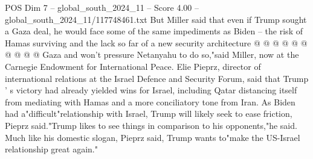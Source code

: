 \begin{textsample}{POS Dim 7 – global\_south\_2024\_11 – Score 4.00 – global\_south\_2024\_11/117748461.txt}
But Miller said that even if Trump sought a Gaza deal, he would face some of the same impediments as Biden -- the risk of Hamas surviving and the lack so far of a new security architecture @ @ @ @ @ @ @ @ @ @ Gaza and won't pressure Netanyahu to do so,"said Miller, now at the Carnegie Endowment for International Peace.
Elie Pieprz, director of international relations at the Israel Defence and Security Forum, said that Trump ' s victory had already yielded wins for Israel, including Qatar distancing itself from mediating with Hamas and a more conciliatory tone from Iran.
As Biden had a"difficult"relationship with Israel, Trump will likely seek to ease friction, Pieprz said."Trump likes to see things in comparison to his opponents,"he said.
Much like his domestic slogan, Pieprz said, Trump wants to"make the US-Israel relationship great again."

\end{textsample}
